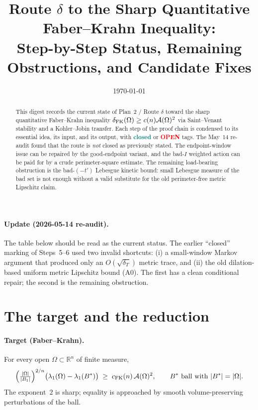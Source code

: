 \documentclass[11pt]{article}
\title{Route $\delta$ to the Sharp Quantitative Faber--Krahn Inequality:\\
       Step-by-Step Status, Remaining Obstructions, and Candidate Fixes}
\author{}
\date{\today}
\theoremstyle{definition}
\newcommand{\R}{\mathbb{R}}
\newcommand{\Om}{\Omega}
\newcommand{\Fr}{\mathcal{A}}
\newcommand{\OPEN}{\textcolor{red}{\bf OPEN}}
\newcommand{\CLOSED}{\textcolor{teal}{\bf closed}}
\begin{document}
\maketitle

\begin{abstract}
This digest records the current state of Plan~2 / Route $\delta$ toward
the sharp quantitative Faber--Krahn inequality
$\delta_{\rm FK}(\Om)\ge c(n)\Fr(\Om)^{2}$ via Saint--Venant stability
and a Kohler--Jobin transfer.  Each step of the proof chain is
condensed to its essential idea, its input, and its output, with
\CLOSED{} or \OPEN{} tags.  The May~14 re-audit found that the route is
\emph{not} closed as previously stated.  The endpoint-window issue can
be repaired by the good-endpoint variant, and the bad-$I$ weighted
action can be paid for by a crude perimeter-square estimate.  The
remaining load-bearing obstruction is the bad-$(-t')$ Lebesgue kinetic
bound: small Lebesgue measure of the bad set is not enough without a
valid substitute for the old perimeter-free metric Lipschitz claim.
\end{abstract}

\paragraph{Update (2026-05-14 re-audit).}
The table below should be read as the current status.  The earlier
``closed'' marking of Steps~5--6 used two invalid shortcuts: (i) a
small-window Markov argument that produced only an $O(\sqrt{\delta_T})$
metric trace, and (ii) the old dilation-based uniform metric Lipschitz
bound (A0).  The first has a clean conditional repair; the second is
the remaining obstruction.

\section{The target and the reduction}\label{sec:target}

\paragraph{Target (Faber--Krahn).}  For every open $\Om\subset\R^{n}$
of finite measure,
\[
   \Bigl(\tfrac{|\Om|}{|B_{1}|}\Bigr)^{2/n}
   \bigl(\lambda_{1}(\Om)-\lambda_{1}(B^{*})\bigr)
   \;\ge\; c_{\rm FK}(n)\,\Fr(\Om)^{2},
   \qquad\text{$B^{*}$ ball with }|B^{*}|=|\Om|.
\]
The exponent~$2$ is sharp; equality is approached by smooth
volume-preserving perturbations of the ball.
\end{document}
